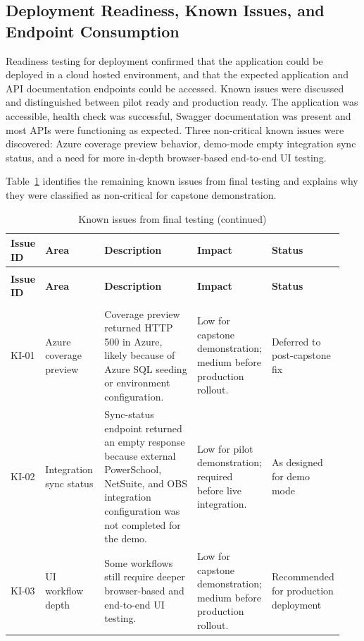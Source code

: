 \subsection{Deployment Readiness, Known Issues, and Endpoint Consumption}

Readiness testing for deployment confirmed that the application could be deployed in a cloud hosted environment, and that the expected application and API documentation endpoints could be accessed. Known issues were discussed and distinguished between pilot ready and production ready. The application was accessible, health check was successful, Swagger documentation was present and most APIs were functioning as expected. Three non-critical known issues were discovered: Azure coverage preview behavior, demo-mode empty integration sync status, and a need for more in-depth browser-based end-to-end UI testing.

\setlength{\LTleft}{0pt}
\setlength{\LTright}{\fill}
Table~\ref{table:known-issues} identifies the remaining known issues from final testing and explains why they were classified as non-critical for capstone demonstration.

\begin{longtable}{>{\raggedright\arraybackslash}p{0.09\linewidth}
>{\raggedright\arraybackslash}p{0.18\linewidth}
>{\raggedright\arraybackslash}p{0.31\linewidth}
>{\raggedright\arraybackslash}p{0.22\linewidth}
>{\raggedright\arraybackslash}p{0.14\linewidth}}
\caption{Known issues from final testing}\label{table:known-issues}\\
\toprule
\textbf{Issue ID} & \textbf{Area} & \textbf{Description} & \textbf{Impact} & \textbf{Status} \\
\midrule
\endfirsthead
\caption[]{Known issues from final testing (continued)}\\
\toprule
\textbf{Issue ID} & \textbf{Area} & \textbf{Description} & \textbf{Impact} & \textbf{Status} \\
\midrule
\endhead
\midrule
\multicolumn{5}{r}{\textit{Continued on next page}}\\
\endfoot
\bottomrule
\endlastfoot
KI-01 & Azure coverage preview & Coverage preview returned HTTP 500 in Azure, likely because of Azure SQL seeding or environment configuration. & Low for capstone demonstration; medium before production rollout. & Deferred to post-capstone fix \\
KI-02 & Integration sync status & Sync-status endpoint returned an empty response because external PowerSchool, NetSuite, and OBS integration configuration was not completed for the demo. & Low for pilot demonstration; required before live integration. & As designed for demo mode \\
KI-03 & UI workflow depth & Some workflows still require deeper browser-based and end-to-end UI testing. & Low for capstone demonstration; medium before production rollout. & Recommended for production deployment \\
\end{longtable}

